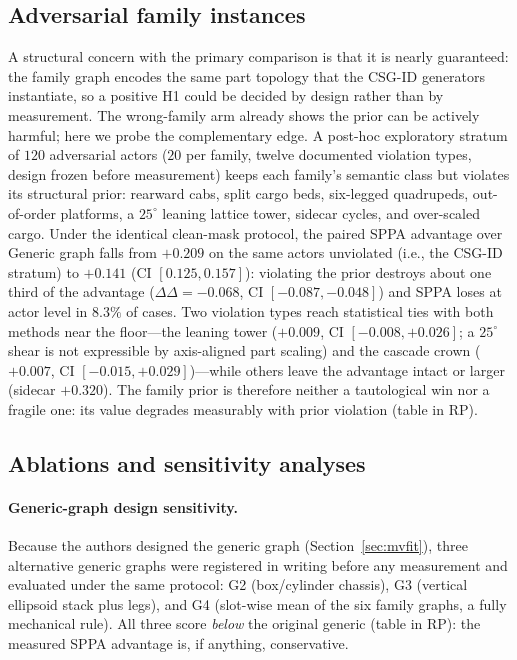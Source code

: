 \documentclass[11pt,a4paper]{article}
\begin{document}
\subsection{Adversarial family instances}
\label{sec:adversarial}

A structural concern with the primary comparison is that it is nearly
guaranteed: the family graph encodes the same part topology that the CSG-ID
generators instantiate, so a positive H1 could be decided by design rather
than by measurement. The wrong-family arm already shows the prior can be
actively harmful; here we probe the complementary edge. A post-hoc
exploratory stratum of \(120\) adversarial actors (\(20\) per family, twelve
documented violation types, design frozen before measurement) keeps each
family's semantic class but violates its structural prior: rearward cabs,
split cargo beds, six-legged quadrupeds, out-of-order
platforms, a \(25^{\circ}\) leaning lattice tower, sidecar cycles, and
over-scaled cargo. Under the identical clean-mask
protocol, the paired SPPA advantage over Generic graph falls from \(+0.209\)
on the same actors unviolated (i.e., the CSG-ID stratum) to \(+0.141\) (CI
\([0.125,0.157]\)): violating
the prior destroys about one third of the advantage
(\(\Delta\Delta=-0.068\), CI \([-0.087,-0.048]\)) and SPPA loses at
actor level in \(8.3\%\) of cases. Two violation types reach statistical
ties with both methods near the floor---the leaning tower (\(+0.009\), CI
\([-0.008,+0.026]\); a \(25^{\circ}\) shear is not expressible by
axis-aligned part scaling) and the cascade crown (\(+0.007\), CI
\([-0.015,+0.029]\))---while others leave the advantage intact or larger
(sidecar \(+0.320\)). The family prior is therefore neither a tautological
win nor a fragile one: its value degrades measurably with
prior violation (table in RP).

\subsection{Ablations and sensitivity analyses}
\label{sec:ablations}

\paragraph{Generic-graph design sensitivity.}
\label{sec:generic-sensitivity}
Because the authors designed the generic graph (Section~\ref{sec:mvfit}),
three alternative generic graphs were registered in writing before any
measurement and evaluated under the same protocol: G2 (box/cylinder chassis),
G3 (vertical ellipsoid stack plus legs), and G4 (slot-wise mean of the six
family graphs, a fully mechanical rule). All three score \emph{below} the
original generic (table in RP): the measured SPPA advantage is, if anything,
conservative.
\end{document}
